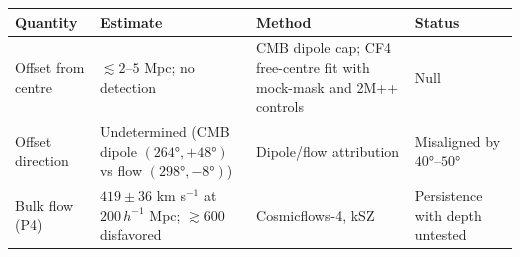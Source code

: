 \documentclass[
]{article}
\begin{document}
\begin{longtable}[]{@{}llll@{}}
\toprule
\begin{minipage}[b]{0.22\columnwidth}\raggedright
Quantity\strut
\end{minipage} & \begin{minipage}[b]{0.22\columnwidth}\raggedright
Estimate\strut
\end{minipage} & \begin{minipage}[b]{0.22\columnwidth}\raggedright
Method\strut
\end{minipage} & \begin{minipage}[b]{0.22\columnwidth}\raggedright
Status\strut
\end{minipage}\tabularnewline
\midrule
\endhead
\begin{minipage}[t]{0.22\columnwidth}\raggedright
Offset from centre\strut
\end{minipage} & \begin{minipage}[t]{0.22\columnwidth}\raggedright
\(\lesssim 2\)--\(5\) Mpc; no detection\strut
\end{minipage} & \begin{minipage}[t]{0.22\columnwidth}\raggedright
CMB dipole cap; CF4 free-centre fit with mock-mask and 2M++
controls\strut
\end{minipage} & \begin{minipage}[t]{0.22\columnwidth}\raggedright
Null\strut
\end{minipage}\tabularnewline
\begin{minipage}[t]{0.22\columnwidth}\raggedright
Offset direction\strut
\end{minipage} & \begin{minipage}[t]{0.22\columnwidth}\raggedright
Undetermined (CMB dipole \((264°,+48°)\) vs flow \((298°,-8°)\))\strut
\end{minipage} & \begin{minipage}[t]{0.22\columnwidth}\raggedright
Dipole/flow attribution\strut
\end{minipage} & \begin{minipage}[t]{0.22\columnwidth}\raggedright
Misaligned by \(40°\)--\(50°\)\strut
\end{minipage}\tabularnewline
\begin{minipage}[t]{0.22\columnwidth}\raggedright
Bulk flow (P4)\strut
\end{minipage} & \begin{minipage}[t]{0.22\columnwidth}\raggedright
\(419 \pm 36\) km s\(^{-1}\) at \(200\,h^{-1}\) Mpc; \(\gtrsim 600\)
disfavored\strut
\end{minipage} & \begin{minipage}[t]{0.22\columnwidth}\raggedright
Cosmicflows-4, kSZ\strut
\end{minipage} & \begin{minipage}[t]{0.22\columnwidth}\raggedright
Persistence with depth untested\strut
\end{minipage}\tabularnewline
\bottomrule
\end{longtable}
\end{document}
